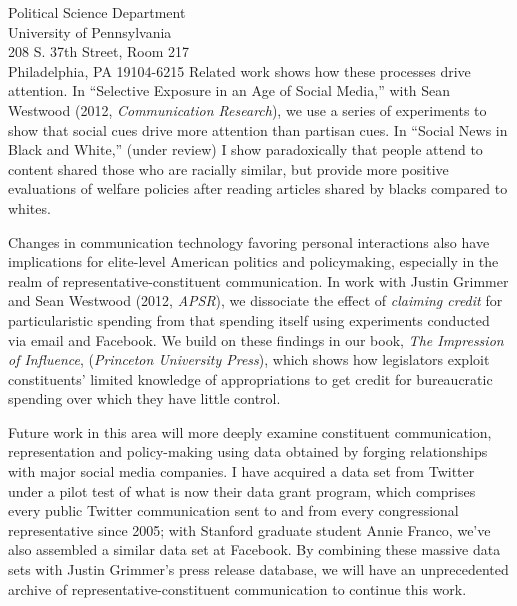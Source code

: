 \documentclass[fontsize=12pt, paper=a4]{scrlttr2}
\begin{document}
\begin{letter}{Political Science Department \\
University of Pennsylvania\\
208 S. 37th Street, Room 217\\
Philadelphia, PA 19104-6215}
Related work shows how these processes drive attention. In ``Selective Exposure in an Age of Social Media,'' with Sean Westwood (2012, \emph{Communication Research}), we use a series of experiments to show that social cues drive more attention than partisan cues.  %
In ``Social News in Black and White,'' (under review) I show paradoxically that people attend to content shared those who are racially similar, but provide more positive evaluations of welfare policies after reading articles shared by blacks compared to whites.  

Changes in communication technology favoring personal interactions also have implications for elite-level American politics and policymaking, especially in the realm of representative-constituent communication.  In work with Justin Grimmer and Sean Westwood (2012, \emph{APSR}), we dissociate the effect of \emph{claiming credit} for particularistic spending from that spending itself using  experiments conducted via email and Facebook.  %
We build on these findings in our book, \emph{The Impression of Influence}, (\emph{Princeton University Press}), which shows how legislators exploit constituents' limited knowledge of appropriations to get credit for bureaucratic spending over which they have little control.  

Future work in this area will more deeply examine constituent communication, representation and policy-making using data obtained by forging relationships with major social media companies.  I have acquired a data set from Twitter under a pilot test of what is now their data grant program, which comprises every public Twitter communication sent to and from every congressional representative since 2005; with Stanford graduate student Annie Franco, we've also assembled a similar data set at Facebook.  By combining these massive data sets with Justin Grimmer's press release database, we will have an unprecedented archive of representative-constituent communication to continue this work.


\end{letter}
\end{document}
